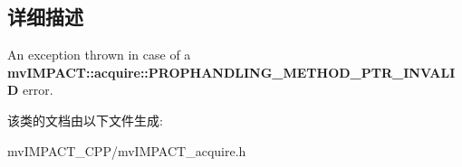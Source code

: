 \subsection{详细描述}
An exception thrown in case of a {\bfseries mv\+I\+M\+P\+A\+C\+T\+::acquire\+::\+P\+R\+O\+P\+H\+A\+N\+D\+L\+I\+N\+G\+\_\+\+M\+E\+T\+H\+O\+D\+\_\+\+P\+T\+R\+\_\+\+I\+N\+V\+A\+L\+I\+D} error. 

该类的文档由以下文件生成\+:\begin{DoxyCompactItemize}
\item 
mv\+I\+M\+P\+A\+C\+T\+\_\+\+C\+P\+P/mv\+I\+M\+P\+A\+C\+T\+\_\+acquire.\+h\end{DoxyCompactItemize}
